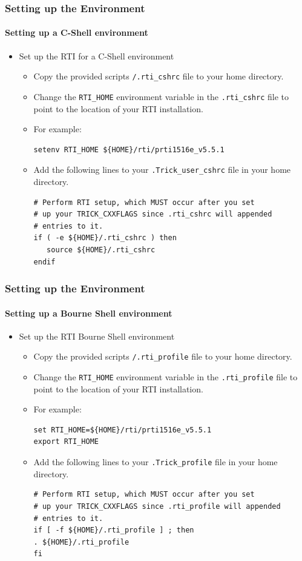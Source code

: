 \documentclass{beamer}
\begin{document}
   \begin{frame}[fragile]
      \frametitle{Setting up the Environment}
      \framesubtitle{Setting up a C-Shell environment}
      \begin{itemize}
         \item Set up the RTI for a C-Shell environment
         \begin{itemize}
            \item Copy the provided scripts \texttt{/.rti\_cshrc} file to your home directory.
            \item Change the \texttt{RTI\_HOME} environment variable in the \texttt{.rti\_cshrc} file to point to the location of your RTI installation.
            \item For example:
\begin{Verbatim}[frame=single]
setenv RTI_HOME ${HOME}/rti/prti1516e_v5.5.1
\end{Verbatim}
            \item Add the following lines to your \texttt{.Trick\_user\_cshrc} file in your home directory.
\begin{Verbatim}[frame=single]
# Perform RTI setup, which MUST occur after you set
# up your TRICK_CXXFLAGS since .rti_cshrc will appended
# entries to it.
if ( -e ${HOME}/.rti_cshrc ) then
   source ${HOME}/.rti_cshrc
endif
\end{Verbatim}
         \end{itemize}
      \end{itemize}
   \end{frame}
   
   \begin{frame}[fragile]
      \frametitle{Setting up the Environment}
      \framesubtitle{Setting up a Bourne Shell environment}
      \begin{itemize}
         \item Set up the RTI Bourne Shell environment
         \begin{itemize}
            \item Copy the provided scripts \texttt{/.rti\_profile} file to your home directory.
            \item Change the \texttt{RTI\_HOME} environment variable in the \texttt{.rti\_profile} file to point to the location of your RTI installation.
            \item For example:
\begin{Verbatim}[frame=single]
set RTI_HOME=${HOME}/rti/prti1516e_v5.5.1
export RTI_HOME
\end{Verbatim}
            \item Add the following lines to your \texttt{.Trick\_profile} file in your home directory.
\begin{Verbatim}[frame=single]
# Perform RTI setup, which MUST occur after you set
# up your TRICK_CXXFLAGS since .rti_profile will appended
# entries to it.
if [ -f ${HOME}/.rti_profile ] ; then
. ${HOME}/.rti_profile
fi
\end{Verbatim}
         \end{itemize}
      \end{itemize}
   \end{frame}
   
\end{document}
